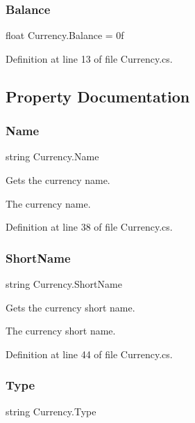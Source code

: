 \subsubsection{\texorpdfstring{Balance}{Balance}}
{\footnotesize\ttfamily float Currency.\+Balance = 0f}



Definition at line 13 of file Currency.\+cs.



\subsection{Property Documentation}
\mbox{\label{class_currency_af25e54090a6fab6786b2b9d2f8fe6cce}} 
\subsubsection{\texorpdfstring{Name}{Name}}
{\footnotesize\ttfamily string Currency.\+Name\hspace{0.3cm}{\ttfamily [get]}}



Gets the currency name. 

The currency name.

Definition at line 38 of file Currency.\+cs.

\mbox{\label{class_currency_aa2f1e1430344046b312382646060b317}} 
\subsubsection{\texorpdfstring{Short\+Name}{ShortName}}
{\footnotesize\ttfamily string Currency.\+Short\+Name\hspace{0.3cm}{\ttfamily [get]}}



Gets the currency short name. 

The currency short name.

Definition at line 44 of file Currency.\+cs.

\mbox{\label{class_currency_a82124a13331b4eddafdc7f5b7bf20a51}} 
\subsubsection{\texorpdfstring{Type}{Type}}
{\footnotesize\ttfamily string Currency.\+Type\hspace{0.3cm}{\ttfamily [get]}}



